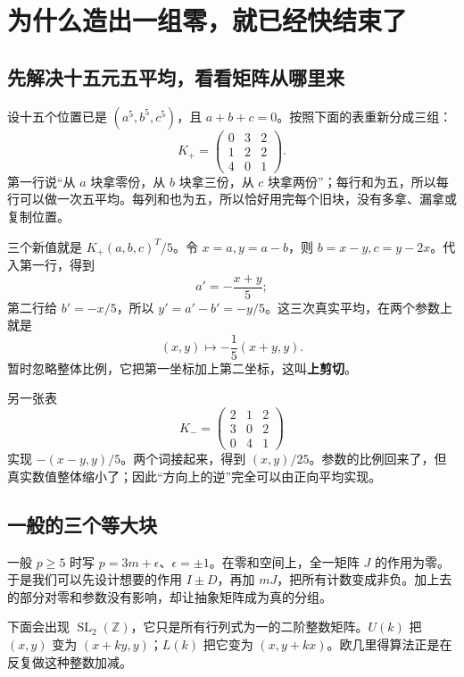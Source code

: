 \documentclass[11pt,a4paper,oneside,openany]{book}
\newcommand{\Z}{\mathbb Z}
\newcommand{\SL}{\operatorname{SL}}
\theoremstyle{definition}
\numberwithin{equation}{chapter}
\begin{document}
\chapter{为什么造出一组零，就已经快结束了}\label{sec:blocks}
\section{先解决十五元五平均，看看矩阵从哪里来}
设十五个位置已是 $(a^5,b^5,c^5)$，且 $a+b+c=0$。按照下面的表重新分成三组：
\[
K_+=\begin{pmatrix}0&3&2\\1&2&2\\4&0&1\end{pmatrix}.
\]
第一行说“从 $a$ 块拿零份，从 $b$ 块拿三份，从 $c$ 块拿两份”；每行和为五，所以每行可以做一次五平均。每列和也为五，所以恰好用完每个旧块，没有多拿、漏拿或复制位置。

三个新值就是 $K_+(a,b,c)^T/5$。令 $x=a,y=a-b$，则 $b=x-y,c=y-2x$。代入第一行，得到
\[a'=-\frac{x+y}{5};
\]
第二行给 $b'=-x/5$，所以 $y'=a'-b'=-y/5$。这三次真实平均，在两个参数上就是
\[(x,y)\longmapsto-\frac15(x+y,y).
\]
暂时忽略整体比例，它把第一坐标加上第二坐标，这叫\textbf{上剪切}。

另一张表
\[K_-=\begin{pmatrix}2&1&2\\3&0&2\\0&4&1\end{pmatrix}
\]
实现 $-(x-y,y)/5$。两个词接起来，得到 $(x,y)/25$。参数的比例回来了，但真实数值整体缩小了；因此“方向上的逆”完全可以由正向平均实现。

\section{一般的三个等大块}
一般 $p\ge5$ 时写 $p=3m+\epsilon$、$\epsilon=\pm1$。在零和空间上，全一矩阵 $J$ 的作用为零。于是我们可以先设计想要的作用 $I\pm D$，再加 $mJ$，把所有计数变成非负。加上去的部分对零和参数没有影响，却让抽象矩阵成为真的分组。

下面会出现 $\SL_2(\Z)$，它只是所有行列式为一的二阶整数矩阵。$U(k)$ 把 $(x,y)$ 变为 $(x+ky,y)$；$L(k)$ 把它变为 $(x,y+kx)$。欧几里得算法正是在反复做这种整数加减。
\end{document}
